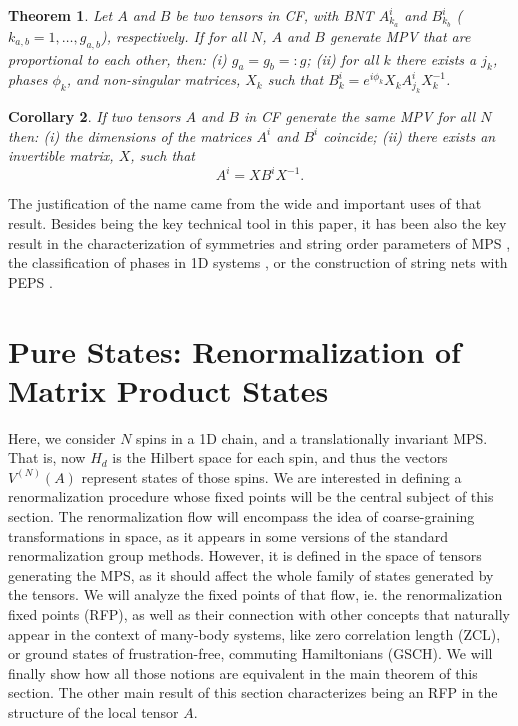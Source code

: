\documentclass{elsarticle}
\newcommand{\be}{\begin{equation}}
\newcommand{\ee}{\end{equation}}
\newtheorem{thm}{Theorem}[section]
\newtheorem{cor}[thm]{Corollary}
\begin{document}
\begin{thm}
    \label{thm1}
    Let $A$ and $B$ be two tensors in CF, with BNT $A^i_{k_a}$ and $B^i_{k_b}$ ($k_{a,b}=1,\dots,g_{a,b}$), respectively. If for all $N$, $A$ and $B$ generate MPV that are proportional to each other, then: (i) $g_a=g_b=:g$; (ii) for all $k$ there exists a $j_k$, phases $\phi_{k}$, and non-singular matrices, $X_{k}$ such that $B^i_{k}=e^{i\phi_{k}}X_{k}A^i_{j_k}X_{k}^{-1}$.
\end{thm}

\begin{cor}
    \label{II_cor2}
    If two tensors $A$ and $B$ in CF generate the same MPV for all $N$ then: (i) the dimensions of the matrices $A^i$ and $B^i$ coincide; (ii) there exists an invertible matrix, $X$, such that
    \be
        \label{eq:II_auxcor}
        A^i = X B^i X^{-1}.
    \ee
\end{cor}

The justification of the name came from the wide and important uses of that result. Besides being the key technical tool in this paper, it has been also the key result in the characterization of symmetries and string order parameters of MPS \cite{Sanz}, the classification of phases in 1D systems \cite{Wen,Norbertphases}, or the construction of string nets with PEPS \cite{FrankStrings}.



\section{Pure States: Renormalization of Matrix Product States}\label{Sec:MPS}

Here, we consider $N$ spins in a 1D chain, and a translationally invariant MPS. That is, now $H_d$ is the Hilbert space for each spin, and thus the vectors $V^{(N)}(A)$ represent states of those spins.
We are interested in defining a renormalization procedure whose fixed points will be the central subject of this section. The renormalization flow will encompass the idea of coarse-graining transformations in space, as it appears in some versions of the standard renormalization group methods. However, it is defined in the space of tensors generating the MPS, as it should affect the whole family of states generated by the tensors. We will analyze the fixed points of that flow, ie. the renormalization fixed points (RFP), as well as their connection with other concepts that naturally appear in the context of many-body systems, like zero correlation length (ZCL), or ground states of frustration-free, commuting Hamiltonians (GSCH). We will finally show how all those notions are equivalent in the main theorem of this section. The other main result of this section characterizes being an RFP in the structure of the local tensor $A$.
\end{document}
